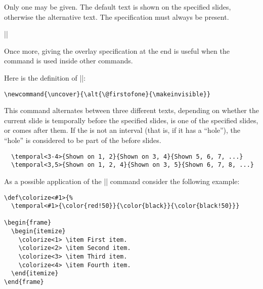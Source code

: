 \begin{command}{\alt{}}
  Only one  may be given. The default text is shown on the specified slides, otherwise the alternative text. The specification must always be present.

  \example
  ||

  Once more, giving the overlay specification at the end is useful when the command is used inside other commands.

  \example
  Here is the definition of |\uncover|:
\begin{verbatim}
\newcommand{\uncover}{\alt{\@firstofone}{\makeinvisible}}
\end{verbatim}
\end{command}

\begin{command}{\temporal{}}
  This command alternates between three different texts, depending on whether the current slide is temporally before the specified slides, is one of the specified slides, or comes after them. If the  is not an interval (that is, if it has a ``hole''), the ``hole'' is considered to be part of the before slides.

  \example
\begin{verbatim}
  \temporal<3-4>{Shown on 1, 2}{Shown on 3, 4}{Shown 5, 6, 7, ...}
  \temporal<3,5>{Shown on 1, 2, 4}{Shown on 3, 5}{Shown 6, 7, 8, ...}
\end{verbatim}

  As a possible application of the |\temporal| command consider the following example:

  \example
\begin{verbatim}
\def\colorize<#1>{%
  \temporal<#1>{\color{red!50}}{\color{black}}{\color{black!50}}}

\begin{frame}
  \begin{itemize}
    \colorize<1> \item First item.
    \colorize<2> \item Second item.
    \colorize<3> \item Third item.
    \colorize<4> \item Fourth item.
  \end{itemize}
\end{frame}
\end{verbatim}
\end{command}



